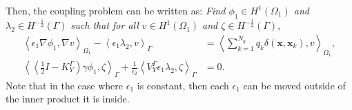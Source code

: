 Then, the coupling problem can be written as: \textit{Find $ \phi_1 \in H^1(\Omega_1)$ and $\lambda_2 \in H^{-\frac{1}{2}}(\Gamma)$ such that for all $v \in H^1(\Omega_1)$ and $\zeta \in H^{-\frac{1}{2}}(\Gamma)$},
\begin{subequations}
\label{eq:standard_fem_bem}
\begin{align} 
 \left\langle  \epsilon_1 \nabla \phi_1, \nabla v \right\rangle_{\Omega_1}  - \left\langle \epsilon_1 \lambda_2, v \right\rangle_\Gamma &=   \left\langle  \sum_{k=1}^{N_q} q_k\delta(\mathbf{x},\mathbf{x}_k),  v \right\rangle_{\Omega_1}, \\[3mm] 
  \left\langle \left\langle\tfrac{1}{2} I - K_{Y}^{\Gamma}\right) \gamma \phi_1, \zeta \right\rangle_\Gamma + \tfrac{1}{\epsilon_2} \left\langle V_{Y}^{\Gamma}\epsilon_1\lambda_2, \zeta \right\rangle_\Gamma &=0.
\end{align}
\end{subequations}
Note that in the case where $\epsilon_1$ is constant, then each $\epsilon_1$ can be moved outside of the inner product it is inside.



